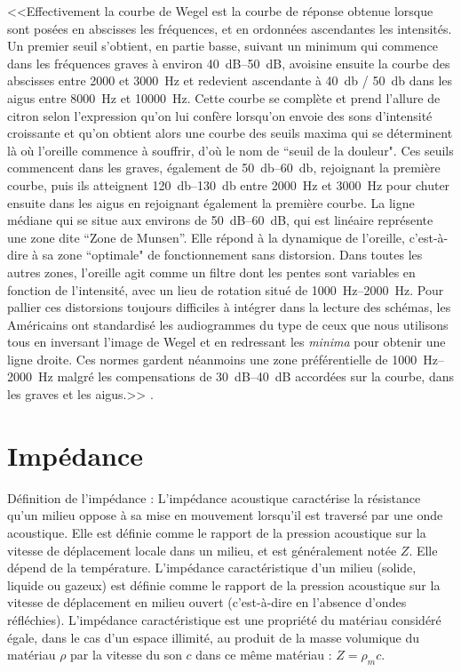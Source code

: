 <<Effectivement la courbe de Wegel est la courbe de réponse obtenue
lorsque sont posées en abscisses les fréquences, et en ordonnées ascendantes
les intensités. Un premier seuil s'obtient, en partie basse, suivant
un minimum qui commence dans les fréquences graves à environ 
\SIrange{40}{50}{\dB}, avoisine ensuite la courbe des abscisses entre 2000 et \SI{3000}{\Hz}
et redevient ascendante à \SI{40}{\decibel} / \SI{50}{\decibel} dans les aigus entre \SI{8000}{\Hz} et
\SI{10000}{\Hz}. Cette courbe se complète et prend l'allure de citron selon
l'expression qu'on lui confère lorsqu'on envoie des
sons d'intensité croissante et qu'on obtient alors une courbe des
seuils maxima qui se déterminent là où l'oreille commence à souffrir,
d'où le nom de ``seuil de la douleur". Ces seuils
commencent dans les graves, également de \SIrange{50}{60}{\decibel}, rejoignant la première
courbe, puis ils atteignent \SIrange{120}{130}{\decibel} entre \SI{2000}{\Hz} et \SI{3000}{\Hz} pour
chuter ensuite dans les aigus en rejoignant également la première
courbe. La ligne médiane qui se situe aux environs de \SIrange{50}{60}{\dB}, qui
est linéaire représente une zone dite ``Zone de Munsen''.
Elle répond à la dynamique de l'oreille, c'est-à-dire
à sa zone ``optimale" de fonctionnement sans
distorsion. Dans toutes les autres zones, l'oreille
agit comme un filtre dont les pentes sont variables en fonction de
l'intensité, avec un lieu de rotation situé de \SIrange{1000}{2000}{\Hz}. Pour pallier ces distorsions toujours difficiles à intégrer
dans la lecture des schémas, les Américains ont standardisé les audiogrammes
du type de ceux que nous utilisons tous en inversant l'image
de Wegel et en redressant les \emph{minima} pour obtenir une ligne droite.
Ces normes gardent néanmoins une zone préférentielle de \SIrange{1000}{2000}{\Hz} malgré les compensations de \SIrange{30}{40}{\dB} accordées sur la courbe,
dans les graves et les aigus.>>
\autocite[Bernard Auriol, conversation, conférence]{auriol_stress}.


\section{Impédance}
\label{impedance}

Définition de l'impédance : L'impédance acoustique
caractérise la résistance qu'un milieu oppose à sa mise en mouvement
lorsqu'il est traversé par une onde acoustique. Elle est définie comme
le rapport de la pression acoustique sur la vitesse de déplacement
locale dans un milieu, et est généralement notée $Z$. Elle dépend de
la température. L'impédance caractéristique d'un milieu (solide, liquide
ou gazeux) est définie comme le rapport de la pression acoustique
sur la vitesse de déplacement en milieu ouvert (c'est-à-dire
en l'absence d'ondes réfléchies). L'impédance caractéristique est
une propriété du matériau considéré égale, dans le cas d'un espace
illimité, au produit de la masse volumique du matériau $\rho$
par la vitesse du son $c$ dans ce même matériau : $Z = \rho_{m} c$.

